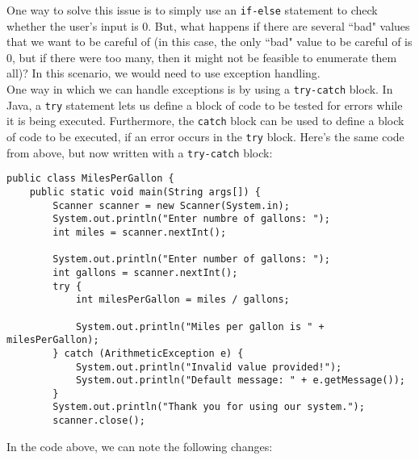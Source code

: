 One way to solve this issue is to simply use an \verb!if-else! statement to check whether the user's input is $0$. But, what happens if there are several ``bad" values that we want to be careful of (in this case, the only ``bad" value to be careful of is $0$, but if there were too many, then it might not be feasible to enumerate them all)? In this scenario, we would need to use exception handling. \\

One way in which we can handle exceptions is by using a \verb!try-catch! block. In Java, a \verb!try! statement lets us define a block of code to be tested for errors while it is being executed. Furthermore, the \verb!catch! block can be used to define a block of code to be executed, if an error occurs in the \verb!try! block. Here's the same code from above, but now written with a \verb!try-catch! block: 

\begin{lstlisting}
public class MilesPerGallon {
    public static void main(String args[]) {
        Scanner scanner = new Scanner(System.in);
        System.out.println("Enter numbre of gallons: ");
        int miles = scanner.nextInt();
        
        System.out.println("Enter number of gallons: ");
        int gallons = scanner.nextInt();
        try {
            int milesPerGallon = miles / gallons;
        
            System.out.println("Miles per gallon is " + milesPerGallon);
        } catch (ArithmeticException e) {
            System.out.println("Invalid value provided!");
            System.out.println("Default message: " + e.getMessage());  
        }
        System.out.println("Thank you for using our system.");
        scanner.close();
\end{lstlisting}

In the code above, we can note the following changes:

